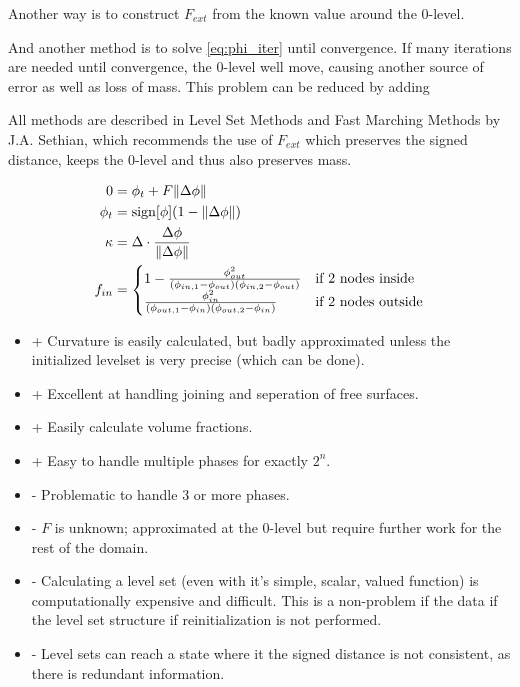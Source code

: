 \documentclass[a4paper,10pt]{article}
\DeclarePairedDelimiter\norm{\lVert}{\rVert}
\DeclareMathOperator*{\sign}{sign}
\begin{document}
Another way is to construct $F_{ext}$ from the known value around the 0-level.

And another method is to solve \eqref{eq:phi_iter} until convergence. If many iterations are needed until convergence, the 0-level well move, causing another source of error as well as loss of mass. This problem can be reduced by adding 

All methods are described in Level Set Methods and Fast Marching Methods by J.A. Sethian, which recommends the use of $F_{ext}$ which preserves the signed distance, keeps the 0-level and thus also preserves mass.

\begin{align}
    0 &= \phi_t + F\norm{\Delta\phi}\\
    \phi_t &= \sign[\phi](1-\norm{\Delta\phi}) \label{eq:phi_iter}\\
    \kappa &= \Delta \cdot \frac{\Delta\phi}{\norm{\Delta\phi}}\\
    f_{in} &= \begin{cases}
        1-\frac{\phi_{out}^2}{(\phi_{in,1}-\phi_{out})(\phi_{in,2}-\phi_{out})} & \text{if 2 nodes inside}\\
          \frac{\phi_{in}^2}{(\phi_{out,1}-\phi_{in})(\phi_{out,2}-\phi_{in})}  & \text{if 2 nodes outside}
        \end{cases}
\end{align}

\begin{itemize}
\item + Curvature is easily calculated, but badly approximated unless the initialized levelset is very precise (which can be done).
\item + Excellent at handling joining and seperation of free surfaces.
\item + Easily calculate volume fractions.
\item + Easy to handle multiple phases for exactly $2^n$. 
\item - Problematic to handle 3 or more phases.
\item - $F$ is unknown; approximated at the 0-level but require further work for the rest of the domain.
\item - Calculating a level set (even with it's simple, scalar, valued function) is computationally expensive and difficult.
        This is a non-problem if the data if the level set structure if reinitialization is not performed.
\item - Level sets can reach a state where it the signed distance is not consistent, as there is redundant information.
\end{itemize}
\end{document}
